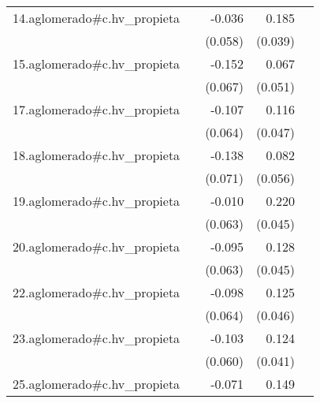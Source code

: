 {\begin{longtable}{l*{4}{D{.}{.}{-1}}}
\addlinespace
14.aglomerado#c.hv\_propieta&                     &      -0.036         &       0.185\sym{***}&                     \\
            &                     &     (0.058)         &     (0.039)         &                     \\
\addlinespace
15.aglomerado#c.hv\_propieta&                     &      -0.152\sym{*}  &       0.067         &                     \\
            &                     &     (0.067)         &     (0.051)         &                     \\
\addlinespace
17.aglomerado#c.hv\_propieta&                     &      -0.107         &       0.116\sym{*}  &                     \\
            &                     &     (0.064)         &     (0.047)         &                     \\
\addlinespace
18.aglomerado#c.hv\_propieta&                     &      -0.138         &       0.082         &                     \\
            &                     &     (0.071)         &     (0.056)         &                     \\
\addlinespace
19.aglomerado#c.hv\_propieta&                     &      -0.010         &       0.220\sym{***}&                     \\
            &                     &     (0.063)         &     (0.045)         &                     \\
\addlinespace
20.aglomerado#c.hv\_propieta&                     &      -0.095         &       0.128\sym{**} &                     \\
            &                     &     (0.063)         &     (0.045)         &                     \\
\addlinespace
22.aglomerado#c.hv\_propieta&                     &      -0.098         &       0.125\sym{**} &                     \\
            &                     &     (0.064)         &     (0.046)         &                     \\
\addlinespace
23.aglomerado#c.hv\_propieta&                     &      -0.103         &       0.124\sym{**} &                     \\
            &                     &     (0.060)         &     (0.041)         &                     \\
\addlinespace
25.aglomerado#c.hv\_propieta&                     &      -0.071         &       0.149\sym{**} &                     \\

\end{longtable}}
